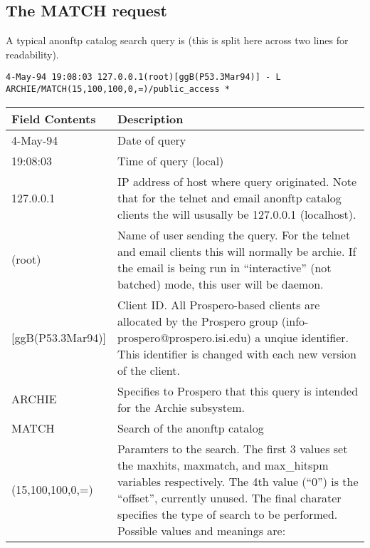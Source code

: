 \subsection{The MATCH request}

A typical anonftp catalog search query is (this is split here across two lines
for readability).


\begin{center}
\texttt{4-May-94 19:08:03 127.0.0.1(root)[ggB(P53.3Mar94)] - L
ARCHIE/MATCH(15,100,100,0,=)/public\_access *}
\end{center}

\begin{center}
\begin{tabular}{|l|p{4in}|} \hline
Field Contents & Description \\ \hline\hline

4-May-94 & Date of query \\ \hline

19:08:03 & Time of query (local) \\ \hline

127.0.0.1 & 
IP address of host where query originated. Note that for the telnet and email
anonftp catalog clients the will ususally be 127.0.0.1 (localhost). \\ \hline

(root) & 
Name of user sending the query. For the telnet and email clients this will
normally be archie. If the email is being run in ``interactive'' (not batched)
mode, this user will be daemon. \\ \hline

[ggB(P53.3Mar94)] & 
Client ID. All Prospero-based clients are allocated by the Prospero group
(info-prospero@prospero.isi.edu) a unqiue identifier. This identifier is
changed with each new version of the client. \\ \hline

ARCHIE & 
Specifies to Prospero that this query is intended for the Archie subsystem. \\ \hline

MATCH & Search of the anonftp catalog \\ \hline

(15,100,100,0,=) & 
Paramters to the search. The first 3 values set the maxhits, maxmatch, and
max\_hitspm variables respectively. The 4th value (``0'') is the ``offset'',
currently unused. The final charater specifies the type of search to be
performed. Possible values and meanings are: 


\end{tabular}
\end{center}
